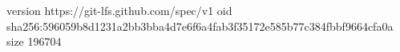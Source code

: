 version https://git-lfs.github.com/spec/v1
oid sha256:596059b8d1231a2bb3bba4d7e6f6a4fab3f35172e585b77c384fbbf9664cfa0a
size 196704
